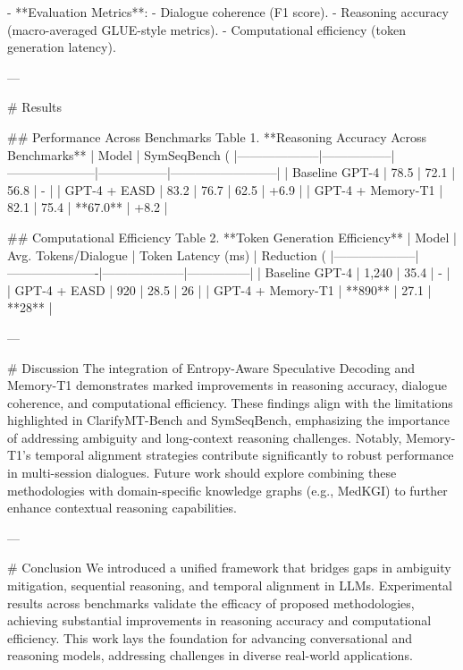 - **Evaluation Metrics**:  
   - Dialogue coherence (F1 score).  
   - Reasoning accuracy (macro-averaged GLUE-style metrics).  
   - Computational efficiency (token generation latency).  

---

# Results  

## Performance Across Benchmarks  
Table 1. **Reasoning Accuracy Across Benchmarks**  
| Model              | SymSeqBench (%
|--------------------|-----------------|---------------------|-----------------|--------------------------|  
| Baseline GPT-4     | 78.5            | 72.1                | 56.8            | -                        |  
| GPT-4 + EASD       | 83.2            | 76.7                | 62.5            | +6.9                     |  
| GPT-4 + Memory-T1  | 82.1            | 75.4                | **67.0**        | +8.2                     |  

## Computational Efficiency  
Table 2. **Token Generation Efficiency**  
| Model              | Avg. Tokens/Dialogue | Token Latency (ms) | Reduction (%
|--------------------|----------------------|--------------------|---------------|  
| Baseline GPT-4     | 1,240                | 35.4               | -             |  
| GPT-4 + EASD       | 920                  | 28.5               | 26            |  
| GPT-4 + Memory-T1  | **890**              | 27.1               | **28**        |  

---

# Discussion  
The integration of Entropy-Aware Speculative Decoding and Memory-T1 demonstrates marked improvements in reasoning accuracy, dialogue coherence, and computational efficiency. These findings align with the limitations highlighted in ClarifyMT-Bench and SymSeqBench, emphasizing the importance of addressing ambiguity and long-context reasoning challenges. Notably, Memory-T1's temporal alignment strategies contribute significantly to robust performance in multi-session dialogues. Future work should explore combining these methodologies with domain-specific knowledge graphs (e.g., MedKGI) to further enhance contextual reasoning capabilities.

---

# Conclusion  
We introduced a unified framework that bridges gaps in ambiguity mitigation, sequential reasoning, and temporal alignment in LLMs. Experimental results across benchmarks validate the efficacy of proposed methodologies, achieving substantial improvements in reasoning accuracy and computational efficiency. This work lays the foundation for advancing conversational and reasoning models, addressing challenges in diverse real-world applications.

